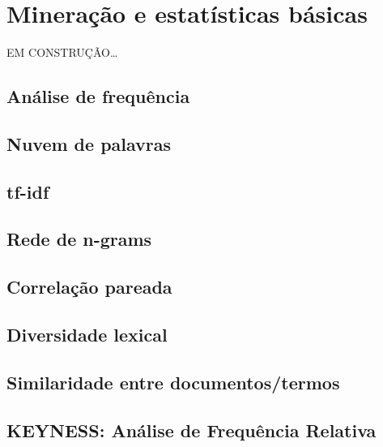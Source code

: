 \documentclass[]{book}
\begin{document}
\hypertarget{stat}{%
\chapter{Mineração e estatísticas básicas}\label{stat}}

EM CONSTRUÇÃO\ldots{}

\hypertarget{anuxe1lise-de-frequuxeancia}{%
\section{Análise de frequência}\label{anuxe1lise-de-frequuxeancia}}

\hypertarget{nuvem-de-palavras}{%
\section{Nuvem de palavras}\label{nuvem-de-palavras}}

\hypertarget{tf-idf}{%
\section{tf-idf}\label{tf-idf}}

\hypertarget{rede-de-n-grams}{%
\section{Rede de n-grams}\label{rede-de-n-grams}}

\hypertarget{correlauxe7uxe3o-pareada}{%
\section{Correlação pareada}\label{correlauxe7uxe3o-pareada}}

\hypertarget{diversidade-lexical}{%
\section{Diversidade lexical}\label{diversidade-lexical}}

\hypertarget{similaridade-entre-documentostermos}{%
\section{Similaridade entre documentos/termos}\label{similaridade-entre-documentostermos}}

\hypertarget{keyness-anuxe1lise-de-frequuxeancia-relativa}{%
\section{KEYNESS: Análise de Frequência Relativa}\label{keyness-anuxe1lise-de-frequuxeancia-relativa}}
\end{document}
